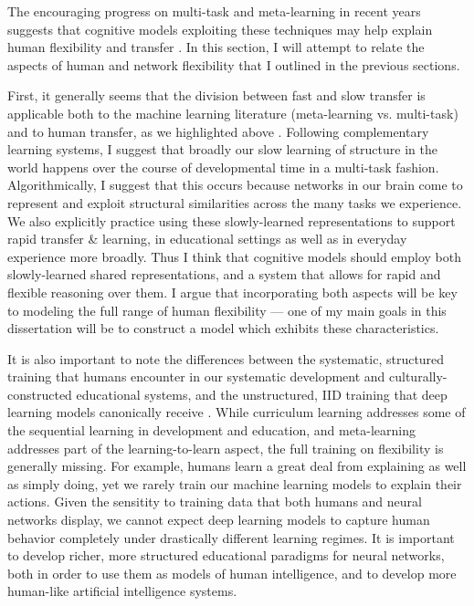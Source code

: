 The encouraging progress on multi-task and meta-learning in recent years suggests that cognitive models exploiting these techniques may help explain human flexibility and transfer \citep{Hansen2017}. In this section, I will attempt to relate the aspects of human and network flexibility that I outlined in the previous sections. \par 
First, it generally seems that the division between fast and slow transfer is applicable both to the machine learning literature (meta-learning vs. multi-task) and to human transfer, as we highlighted above \citep[and in prior work, namely][]{Lampinen2017a}. Following complementary learning systems, I suggest that broadly our slow learning of structure in the world happens over the course of developmental time in a multi-task fashion. Algorithmically, I suggest that this occurs because networks in our brain come to represent and exploit structural similarities across the many tasks we experience. We also explicitly practice using these slowly-learned representations to support rapid transfer \& learning, in educational settings as well as in everyday experience more broadly. Thus I think that cognitive models should employ both slowly-learned shared representations, and a system that allows for rapid and flexible reasoning over them. I argue that incorporating both aspects will be key to modeling the full range of human flexibility --- one of my main goals in this dissertation will be to construct a model which exhibits these characteristics. \par 
It is also important to note the differences between the systematic, structured training that humans encounter in our systematic development and culturally-constructed educational systems, and the unstructured, IID training that deep learning models canonically receive \citep{Smith2017}. While curriculum learning addresses some of the sequential learning in development and education, and meta-learning addresses part of the learning-to-learn aspect, the full training on flexibility is generally missing. For example, humans learn a great deal from explaining as well as simply doing, yet we rarely train our machine learning models to explain their actions. Given the sensitity to training data that both humans and neural networks display, we cannot expect deep learning models to capture human behavior completely under drastically different learning regimes. It is important to develop richer, more structured educational paradigms for neural networks, both in order to use them as models of human intelligence, and to develop more human-like artificial intelligence systems. \par
